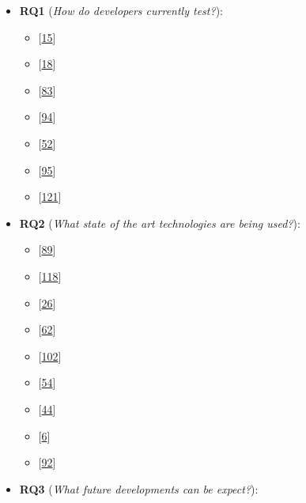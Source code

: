\documentclass[]{book}
\providecommand{\tightlist}{%
  \setlength{\itemsep}{0pt}\setlength{\parskip}{0pt}}
\begin{document}
\begin{itemize}
\tightlist
\item
  \textbf{RQ1} (\emph{How do developers currently test?}):

  \begin{itemize}
  \tightlist
  \item
    {[}\protect\hyperlink{ref-beller2017developer}{15}{]}
  \item
    {[}\protect\hyperlink{ref-beller2015}{18}{]}
  \item
    {[}\protect\hyperlink{ref-marsavina2014}{83}{]}
  \item
    {[}\protect\hyperlink{ref-pinto2013}{94}{]}
  \item
    {[}\protect\hyperlink{ref-GAROUSI20131354}{52}{]}
  \item
    {[}\protect\hyperlink{ref-pinto2012understanding}{95}{]}
  \item
    {[}\protect\hyperlink{ref-zaidman2011studying}{121}{]}
  \end{itemize}
\item
  \textbf{RQ2} (\emph{What state of the art technologies are being
  used?}):

  \begin{itemize}
  \tightlist
  \item
    {[}\protect\hyperlink{ref-supportingtestsuite}{89}{]}
  \item
    {[}\protect\hyperlink{ref-vernotte2015}{118}{]}
  \item
    {[}\protect\hyperlink{ref-bowring2014obsidian}{26}{]}
  \item
    {[}\protect\hyperlink{ref-hurdugaci2012}{62}{]}
  \item
    {[}\protect\hyperlink{ref-robinson2011}{102}{]}
  \item
    {[}\protect\hyperlink{ref-greiler2013}{54}{]}
  \item
    {[}\protect\hyperlink{ref-dulz2013model}{44}{]}
  \item
    {[}\protect\hyperlink{ref-atifi2017}{6}{]}
  \item
    {[}\protect\hyperlink{ref-noor2015test}{92}{]}
  \end{itemize}
\item
  \textbf{RQ3} (\emph{What future developments can be expect?}):


\end{itemize}
\end{document}
